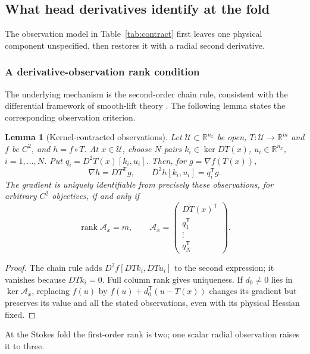 \documentclass[pdflatex,sn-mathphys-num]{sn-jnl}
\newtheorem{lemma}{Lemma}
\begin{document}
\subsection{What head derivatives identify at the fold}
\label{sec:stationarity}
The observation model in Table~\ref{tab:contract} first leaves one physical component unspecified, then restores it with a radial second derivative.

\subsubsection{A derivative-observation rank condition}
The underlying mechanism is the second-order chain rule, consistent with the differential framework of smooth-lift theory \cite{lifts}. The following lemma states the corresponding observation criterion.
\begin{lemma}[Kernel-contracted observations]
\label{lem:observation}
Let $\mathcal U\subset\mathbb R^{n_x}$ be open, $T:\mathcal U\to\mathbb R^m$ and $f$ be $C^2$, and $h=f\circ T$. At $x\in\mathcal U$, choose $N$ pairs $k_i\in\ker DT(x)$, $u_i\in\mathbb R^{n_x}$, $i=1,\ldots,N$. Put $q_i=D^2T(x)[k_i,u_i]$. Then, for $g=\nabla f(T(x))$,
\begin{equation}
 \nabla h=DT^{\mathsf T}g,\qquad
 D^2h[k_i,u_i]=q_i^{\mathsf T}g.
 \label{eq:observation}
\end{equation}
The gradient is uniquely identifiable from precisely these observations, for arbitrary $C^2$ objectives, if and only if
\begin{equation}
 \operatorname{rank}\mathcal A_x=m,\qquad
 \mathcal A_x=\begin{pmatrix}DT(x)^{\mathsf T}\\q_1^{\mathsf T}\\\vdots\\q_N^{\mathsf T}\end{pmatrix}.
 \label{eq:observationrank}
\end{equation}
\end{lemma}
\begin{proof}
The chain rule adds $D^2f[DTk_i,DTu_i]$ to the second expression; it vanishes because $DTk_i=0$. Full column rank gives uniqueness. If $d_0\ne0$ lies in $\ker\mathcal A_x$, replacing $f(u)$ by $f(u)+d_0^{\mathsf T}(u-T(x))$ changes its gradient but preserves its value and all the stated observations, even with its physical Hessian fixed.
\end{proof}
At the Stokes fold the first-order rank is two; one scalar radial observation raises it to three.
\end{document}
